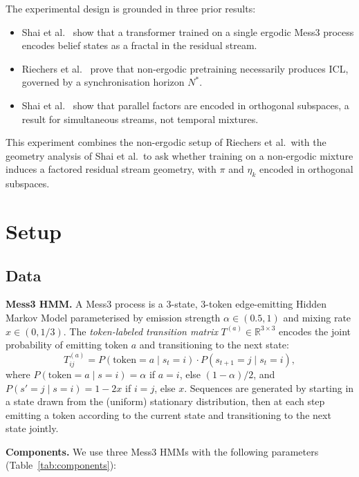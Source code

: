 \documentclass{article}
\begin{document}
The experimental design is grounded in three prior results:
\begin{itemize}[noitemsep]
  \item Shai et al.~\cite{shai2024belief} show that a transformer trained on a
        single ergodic Mess3 process encodes belief states as a fractal in the
        residual stream.
  \item Riechers et al.~\cite{riechers2025} prove that non-ergodic pretraining
        necessarily produces ICL, governed by a synchronisation horizon $N^*$.
  \item Shai et al.~\cite{shai2025factored} show that parallel factors are
        encoded in orthogonal subspaces, a result for simultaneous streams,
        not temporal mixtures.
\end{itemize}
This experiment combines the non-ergodic setup of Riechers et al.\ with the
geometry analysis of Shai et al.\ to ask whether training on a non-ergodic mixture
induces a factored residual stream geometry, with $\pi$ and $\eta_k$ encoded in
orthogonal subspaces.

\section{Setup}
\label{sec:setup}

\subsection{Data}

\textbf{Mess3 HMM.}
A Mess3 process is a 3-state, 3-token edge-emitting Hidden Markov Model
parameterised by emission strength $\alpha \in (0.5, 1)$ and mixing rate
$x \in (0, 1/3)$.
The \emph{token-labeled transition matrix} $T^{(a)} \in \mathbb{R}^{3 \times 3}$
encodes the joint probability of emitting token $a$ and transitioning to the
next state:
\[
T^{(a)}_{ij} = P(\text{token}=a \mid s_t=i)\cdot P(s_{t+1}=j \mid s_t=i),
\]
where $P(\text{token}=a \mid s=i) = \alpha$ if $a=i$, else $(1-\alpha)/2$,
and $P(s'=j \mid s=i) = 1-2x$ if $i=j$, else $x$.
Sequences are generated by starting in a state drawn from the (uniform)
stationary distribution, then at each step emitting a token according to the
current state and transitioning to the next state jointly.

\textbf{Components.} We use three Mess3 HMMs with the following parameters (Table~\ref{tab:components}):
\end{document}

